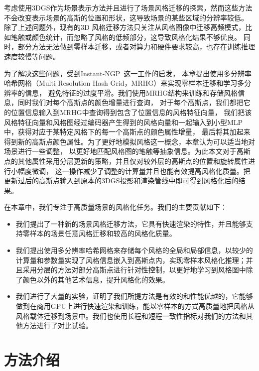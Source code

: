 考虑使用3DGS作为场景表示方法并且进行了场景风格迁移的探索，然而这些方法不会改变表示场景的高斯的位置和形状，这导致场景的某些区域的分辨率较低。
除了上述问题外，现有的3D 风格迁移方法只关注从风格图像中迁移高频模式，比如笔触或颜色统计，而忽略了风格的低频部分，这导致风格化结果不够优良。
同时，部分方法无法做到零样本迁移，或者对算力和硬件要求较高，也存在训练推理速度较慢等问题。
\par 为了解决这些问题，受到Instant-NGP~\cite{muller2022instant}这一工作的启发，
本章提出使用多分辨率哈希网格（Multi Resolution Hash Grid，MRHG）来实现零样本迁移和学习多分辨率的信息，
避免特征的过度平滑。我们使用MRHG结构来训练和存储风格信息，同时我们对每个高斯点的颜色增量进行查询，
对于每个高斯点，我们都把它的位置信息输入到MRHG中查询得到包含了位置信息的风格特征向量，
我们把该风格特征向量和风格图经过编码器产生得到的风格向量和一起输入到小型MLP中，获得对应于某特定风格下的每一个高斯点的颜色属性增量，
最后将其加起来得到新的高斯点颜色属性。为了更好地模拟风格这一概念，本章认为可以适当地对场景进行一些调整，
以更好地匹配风格图的笔触等抽象信息。为此本文对于高斯点的其他属性采用分层更新的策略，并且仅对较外层的高斯点的位置和旋转属性进行小幅度微调，
这一操作减少了调整的计算量并且也能有效提高风格化质量。把更新过后的高斯点输入到原本的3DGS投影和渲染管线中即可得到风格化后的结果。
\par 在本章中，我们专注于高质量场景的风格化任务。我们的主要贡献如下：
\begin{itemize}
    \item 我们提出了一种新的场景风格迁移方法，它具有快速渲染的特性，并且能够支持零样本的场景任意风格迁移和较高的风格化质量。
    \item 我们提出使用多分辨率哈希网格来存储每个风格的全局和局部信息，以较少的计算量和参数量实现了风格信息嵌入到高斯点内，实现零样本风格化推理；并且采用分层的方法对部分高斯点进行针对性控制，以更好地学习到风格图中除了颜色以外的其他艺术信息，提升风格化的效果。
    \item 我们进行了大量的实验，证明了我们所提方法是有效的和性能优越的，它能够做到在商用GPU上进行快速渲染和训练，能以零样本的方式高质量地把风格从风格载体迁移到场景中。我们也使用长程和短程一致性指标对我们的方法和其他方法进行了对比试验。
\end{itemize}

\section{方法介绍}
